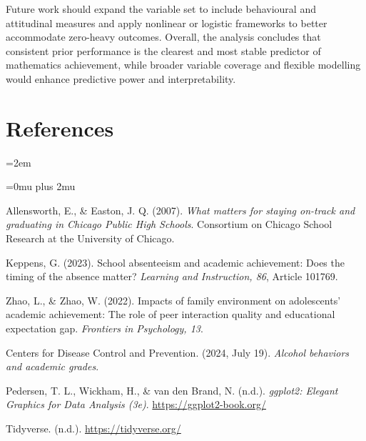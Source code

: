 \documentclass[9pt,twocolumn,twoside,]{pinp}
\begin{document}
Future work should expand the variable set to include behavioural and
attitudinal measures and apply nonlinear or logistic frameworks to
better accommodate zero-heavy outcomes. Overall, the analysis concludes
that consistent prior performance is the clearest and most stable
predictor of mathematics achievement, while broader variable coverage
and flexible modelling would enhance predictive power and
interpretability. \newpage

\section{References}\label{references}

\begingroup
\setlength{\parindent}{0pt}
\setlength{\parskip}{0.5em}
\sloppy
\emergencystretch=2em

\Urlmuskip=0mu plus 2mu \def\UrlBreaks{\do\/\do-\do\_\do\.\do\?\do\&}

\hangindent=0.5in  Allensworth, E., \& Easton, J. Q. (2007).
\textit{What matters for staying on-track and graduating in Chicago Public High Schools}.
Consortium on Chicago School Research at the University of Chicago.

\par

\hangindent=0.5in  Keppens, G. (2023). School absenteeism
and academic achievement: Does the timing of the absence matter?
\textit{Learning and Instruction, 86}, Article 101769.

\par

\hangindent=0.5in  Zhao, L., \& Zhao, W. (2022). Impacts of
family environment on adolescents' academic achievement: The role of
peer interaction quality and educational expectation gap.
\textit{Frontiers in Psychology, 13}.

\par

\hangindent=0.5in  Centers for Disease Control and
Prevention. (2024, July 19).
\textit{Alcohol behaviors and academic grades}.

\par

\hangindent=0.5in  Pedersen, T. L., Wickham, H., \& van den
Brand, N. (n.d.).
\textit{ggplot2: Elegant Graphics for Data Analysis (3e)}.
\url{https://ggplot2-book.org/}

\par

\hangindent=0.5in  Tidyverse. (n.d.).
\url{https://tidyverse.org/}
\end{document}
